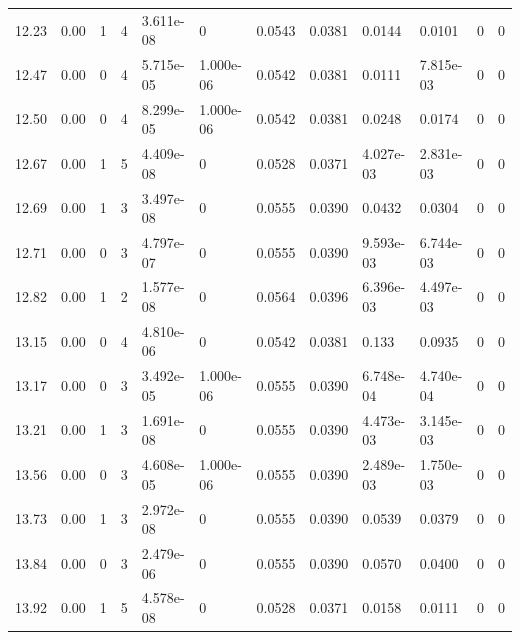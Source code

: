 \documentclass[preview]{standalone}
\begin{document}
{{{\begin{tabular}{L{1.2cm}C{1.2cm} C{0.3cm}C{0.5cm} C{1.4cm}C{1.4cm} C{1.4cm}C{1.4cm} C{1.6cm}C{1.6cm} C{1.6cm}C{1.6cm}}
  12.23  &  0.00  & 1     &  4 &  3.611e-08  & 0  &  0.0543&   0.0381& 0.0144 & 0.0101   &  0 & 0  \\ 
  12.47  &  0.00  & 0     &  4 &  5.715e-05  & 1.000e-06  &  0.0542&   0.0381& 0.0111 & 7.815e-03   &  0 & 0  \\ 
  12.50  &  0.00  & 0     &  4 &  8.299e-05  & 1.000e-06  &  0.0542&   0.0381& 0.0248 & 0.0174   &  0 & 0  \\ 
  12.67  &  0.00  & 1     &  5 &  4.409e-08  & 0  &  0.0528&   0.0371& 4.027e-03 & 2.831e-03   &  0 & 0  \\ 
  12.69  &  0.00  & 1     &  3 &  3.497e-08  & 0  &  0.0555&   0.0390& 0.0432 & 0.0304   &  0 & 0  \\ 
  12.71  &  0.00  & 0     &  3 &  4.797e-07  & 0  &  0.0555&   0.0390& 9.593e-03 & 6.744e-03   &  0 & 0  \\ 
  12.82  &  0.00  & 1     &  2 &  1.577e-08  & 0  &  0.0564&   0.0396& 6.396e-03 & 4.497e-03   &  0 & 0  \\ 
  13.15  &  0.00  & 0     &  4 &  4.810e-06  & 0  &  0.0542&   0.0381& 0.133 & 0.0935   &  0 & 0  \\ 
  13.17  &  0.00  & 0     &  3 &  3.492e-05  & 1.000e-06  &  0.0555&   0.0390& 6.748e-04 & 4.740e-04   &  0 & 0  \\ 
  13.21  &  0.00  & 1     &  3 &  1.691e-08  & 0  &  0.0555&   0.0390& 4.473e-03 & 3.145e-03   &  0 & 0  \\ 
  13.56  &  0.00  & 0     &  3 &  4.608e-05  & 1.000e-06  &  0.0555&   0.0390& 2.489e-03 & 1.750e-03   &  0 & 0  \\ 
  13.73  &  0.00  & 1     &  3 &  2.972e-08  & 0  &  0.0555&   0.0390& 0.0539 & 0.0379   &  0 & 0  \\ 
  13.84  &  0.00  & 0     &  3 &  2.479e-06  & 0  &  0.0555&   0.0390& 0.0570 & 0.0400   &  0 & 0  \\ 
  13.92  &  0.00  & 1     &  5 &  4.578e-08  & 0  &  0.0528&   0.0371& 0.0158 & 0.0111   &  0 & 0  \\ 
\hline 
\end{tabular} 

}}}
\end{document}
